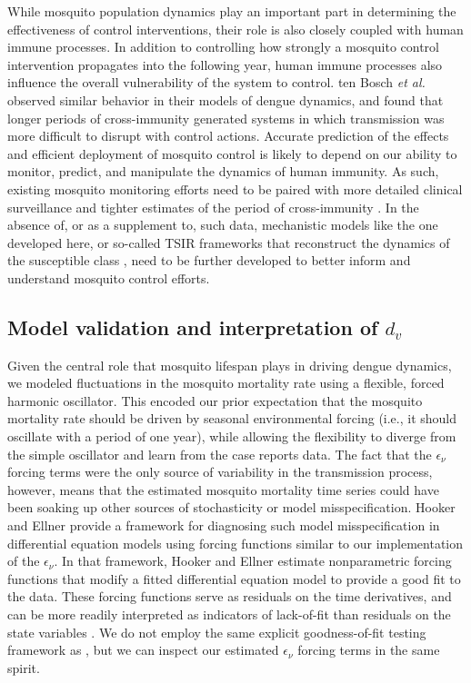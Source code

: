 \documentclass[10pt,letterpaper]{article}
\begin{document}
While mosquito population dynamics play an important part in determining the effectiveness of control interventions, their role is also closely coupled with human immune processes.
In addition to controlling how strongly a mosquito control intervention propagates into the following year, human immune processes also influence the overall vulnerability of the system to control.
ten Bosch \emph{et al.} \cite{TenBosch2016} observed similar behavior in their models of dengue dynamics, and found that longer periods of cross-immunity generated systems in which transmission was more difficult to disrupt with control actions.
Accurate prediction of the effects and efficient deployment of mosquito control is likely to depend on our ability to monitor, predict, and manipulate the dynamics of human immunity.
As such, existing mosquito monitoring efforts need to be paired with more detailed clinical surveillance \cite{Morrison2008} and tighter estimates of the period of cross-immunity \cite{TenBosch2016}.
In the absence of, or as a supplement to, such data, mechanistic models like the one developed here, or so-called TSIR frameworks that reconstruct the dynamics of the susceptible class \cite{Finkenstadt2000, Reich2013}, need to be further developed to better inform and understand mosquito control efforts.

\subsection*{Model validation and interpretation of $d_v$}

Given the central role that mosquito lifespan plays in driving dengue dynamics, we modeled fluctuations in the mosquito mortality rate using a flexible, forced harmonic oscillator.
This encoded our prior expectation that the mosquito mortality rate should be driven by seasonal environmental forcing (i.e., it should oscillate with a period of one year), while allowing the flexibility to diverge from the simple oscillator and learn from the case reports data.
The fact that the $\epsilon_{\nu}$ forcing terms were the only source of variability in the transmission process, however, means that the estimated mosquito mortality time series could have been soaking up other sources of stochasticity or model misspecification.
Hooker and Ellner \cite{Hooker2015} provide a framework for diagnosing such model misspecification in differential equation models using forcing functions similar to our implementation of the $\epsilon_{\nu}$.
In that framework, Hooker and Ellner \cite{Hooker2015} estimate nonparametric forcing functions that modify a fitted differential equation model to provide a good fit to the data.
These forcing functions serve as residuals on the time derivatives, and can be more readily interpreted as indicators of lack-of-fit than residuals on the state variables \cite{Hotelling1927, Hooker2015}.
We do not employ the same explicit goodness-of-fit testing framework as \cite{Hooker2015}, but we can inspect our estimated $\epsilon_{\nu}$ forcing terms in the same spirit.
\end{document}
